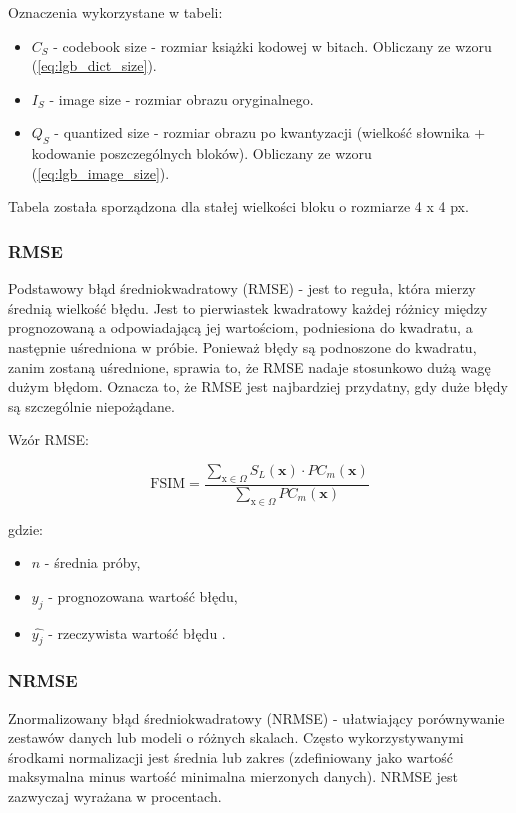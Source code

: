 \documentclass{article}
\begin{document}
Oznaczenia wykorzystane w tabeli:
\begin{itemize}[label=]
	\item $C_S$ - codebook size - rozmiar książki kodowej w bitach. Obliczany ze wzoru (\ref{eq:lgb_dict_size}).
    \item $I_S$ - image size - rozmiar obrazu oryginalnego.
		\item $Q_S$ - quantized size - rozmiar obrazu po kwantyzacji (wielkość słownika + kodowanie poszczególnych bloków). Obliczany ze wzoru (\ref{eq:lgb_image_size}).
\end{itemize}

Tabela została sporządzona dla stałej wielkości bloku o rozmiarze 4 x 4 px.

\subsubsection{RMSE}

Podstawowy błąd średniokwadratowy (RMSE) - jest to reguła, która mierzy średnią wielkość błędu. Jest to pierwiastek kwadratowy każdej różnicy między prognozowaną a odpowiadającą jej wartościom, podniesiona do kwadratu, a następnie uśredniona w próbie. Ponieważ błędy są podnoszone do kwadratu, zanim zostaną uśrednione, sprawia to, że RMSE nadaje stosunkowo dużą wagę dużym błędom. Oznacza to, że RMSE jest najbardziej przydatny, gdy duże błędy są szczególnie niepożądane.

Wzór RMSE:

\begin{equation}
\mathrm{FSIM}=\frac{\sum_{\mathrm{x} \in \Omega} S_{L}(\mathbf{x}) \cdot P C_{m}(\mathbf{x})}{\sum_{\mathrm{x} \in \Omega} P C_{m}(\mathbf{x})}
\end{equation}

gdzie:
\begin{itemize}[label=]
    \item $n$ - średnia próby,
    \item $y_{j}$ - prognozowana wartość błędu,
    \item $\hat{y_{j}}$ - rzeczywista wartość błędu \cite{rmse}.
\end{itemize}

\subsubsection{NRMSE}

Znormalizowany błąd średniokwadratowy (NRMSE) - ułatwiający porównywanie zestawów danych lub modeli o różnych skalach. Często wykorzystywanymi środkami normalizacji jest średnia lub zakres (zdefiniowany jako wartość maksymalna minus wartość minimalna mierzonych danych). NRMSE jest zazwyczaj wyrażana w procentach.
\end{document}
